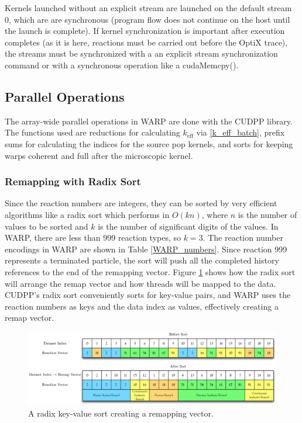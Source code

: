 Kernels launched without an explicit stream are launched on the default stream 0, which are are synchronous (program flow does not continue on the host until the launch is complete).  If kernel synchronization is important after execution completes (as it is here, reactions must be carried out before the OptiX trace), the streams must be synchronized with a an explicit stream synchronization command or with a synchronous operation like a cudaMemcpy().

\subsection{Parallel Operations}

The array-wide parallel operations in WARP are done with the CUDPP library.  The functions used are reductions for calculating $k_\mathrm{eff}$ via \eqref{k_eff_batch}, prefix sums for calculating the indices for the source pop kernels, and sorts for keeping warps coherent and full after the microscopic kernel.

\subsubsection{Remapping with Radix Sort}

Since the reaction numbers are integers, they can be sorted by very efficient algorithms like a radix sort which performs in $O(kn)$, where $n$ is the number of values to be sorted and $k$ is the number of significant digits of the values.  In WARP, there are less than 999 reaction types, so $k=3$.  The reaction number encodings in WARP are shown in Table \ref{WARP_numbers}.  Since reaction 999 represents a terminated particle, the sort will push all the completed history references to the end of the remapping vector.  Figure \ref{radix_sort} shows how the radix sort will arrange the remap vector and how threads will be mapped to the data.  CUDPP's radix sort conveniently sorts for key-value pairs, and WARP uses the reaction numbers as keys and the data index as values, effectively creating a remap vector.

\begin{figure}[h!] 
\centering
\includegraphics[width=1.0\textwidth]{graphics/radix_horiz.eps}
\caption{A radix key-value sort creating a remapping vector. \label{radix_sort} }
\end{figure}

